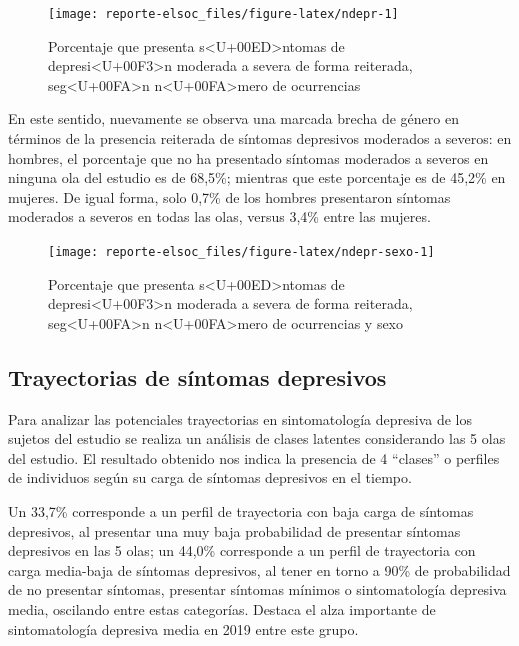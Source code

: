 \documentclass[
  12pt,
]{book}
\begin{document}
\begin{figure}

{\centering \texttt{[image: reporte-elsoc\_files/figure-latex/ndepr-1]} 

}

\caption{Porcentaje que presenta s<U+00ED>ntomas de depresi<U+00F3>n moderada a severa de forma reiterada, seg<U+00FA>n n<U+00FA>mero de ocurrencias}\label{fig:ndepr}
\end{figure}

En este sentido, nuevamente se observa una marcada brecha de género en términos de la presencia reiterada de síntomas depresivos moderados a severos: en hombres, el porcentaje que no ha presentado síntomas moderados a severos en ninguna ola del estudio es de 68,5\%; mientras que este porcentaje es de 45,2\% en mujeres. De igual forma, solo 0,7\% de los hombres presentaron síntomas moderados a severos en todas las olas, versus 3,4\% entre las mujeres.

\begin{figure}

{\centering \texttt{[image: reporte-elsoc\_files/figure-latex/ndepr-sexo-1]} 

}

\caption{Porcentaje que presenta s<U+00ED>ntomas de depresi<U+00F3>n moderada a severa de forma reiterada, seg<U+00FA>n n<U+00FA>mero de ocurrencias y sexo}\label{fig:ndepr-sexo}
\end{figure}

\hypertarget{trayectorias-de-suxedntomas-depresivos}{%
\subsection*{Trayectorias de síntomas depresivos}\label{trayectorias-de-suxedntomas-depresivos}}

Para analizar las potenciales trayectorias en sintomatología depresiva de los sujetos del estudio se realiza un análisis de clases latentes considerando las 5 olas del estudio. El resultado obtenido nos indica la presencia de 4 ``clases'' o perfiles de individuos según su carga de síntomas depresivos en el tiempo.

Un 33,7\% corresponde a un perfil de trayectoria con baja carga de síntomas depresivos, al presentar una muy baja probabilidad de presentar síntomas depresivos en las 5 olas; un 44,0\% corresponde a un perfil de trayectoria con carga media-baja de síntomas depresivos, al tener en torno a 90\% de probabilidad de no presentar síntomas, presentar síntomas mínimos o sintomatología depresiva media, oscilando entre estas categorías. Destaca el alza importante de sintomatología depresiva media en 2019 entre este grupo.
\end{document}
